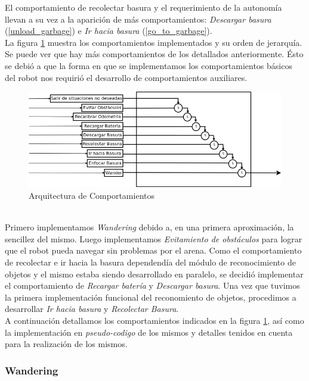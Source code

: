 El comportamiento de recolectar basura y el requerimiento de la autonom\'ia llevan a su vez
a la aparici\'on de m\'as comportamientos: \emph{Descargar basura} (\ref{unload_garbage})
e \emph{Ir hacia basura} (\ref{go_to_garbage}).
\\
La figura \ref{fig:architecture} muestra los comportamientos implementados y su orden de jerarqu\'ia.
Se puede ver que hay m\'as comportamientos de los detallados anteriormente. \'Esto se debi\'o a que la forma
en que se implementamos los comportamientos b\'asicos del robot nos requiri\'o el desarrollo
de comportamientos auxiliares.
\\
\begin{figure}[htp]
\begin{center}
\includegraphics[scale=0.5]{comportamientos/behavioursArchitecture.png}
\caption{Arquitectura de Comportamientos}
\label{fig:architecture}
\end{center}
\end{figure}
\\
Primero implementamos \emph{Wandering} debido a, en una primera aproximaci\'on, la sencillez
del mismo. Luego implementamos \emph{Evitamiento de obst\'aculos} para lograr que el robot pueda
navegar sin problemas por el arena. Como el comportamiento de recolectar e ir hacia la basura
dependend\'ia del m\'odulo de reconocimiento de objetos y el mismo estaba siendo desarrollado
en paralelo, se decidi\'o implementar el comportamiento de \emph{Recargar bater\'ia} y \emph{Descargar basura}.
Una vez que tuvimos la primera implementaci\'on funcional del reconomiento de objetos, procedimos a
desarrollar \emph{Ir hacia basura} y \emph{Recolectar Basura}.
\\
A continuaci\'on detallamos los comportamientos indicados en la figura \ref{fig:architecture},
as\'i como la implementaci\'on en \textit{pseudo-codigo} de los mismos y detalles tenidos
en cuenta para la realizaci\'on de los mismos.

\subsubsection{Wandering}
\label{wandering}

